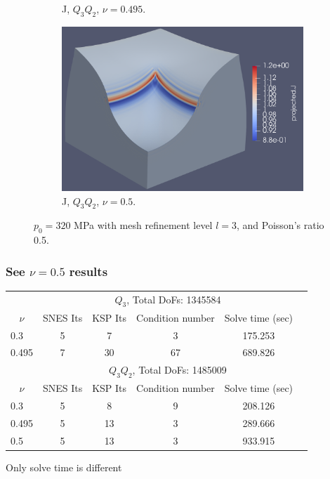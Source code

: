 \documentclass{beamer}
\begin{document}
\begin{frame}
\begin{figure}[H]
\begin{subfigure}{.5\textwidth}
			\caption{J, $Q_3Q_2$, $\nu=0.495$.}
		\end{subfigure}%
		\begin{subfigure}{.5\textwidth}
			\centering
			\includegraphics[width=.68\textwidth]{../figs/J-Q3Q2-320MPa-0.5.png}
			\caption{J, $Q_3Q_2$, $\nu=0.5$.}
		\end{subfigure}
		\caption*{$p_0=320$ MPa with mesh refinement level $l=3$, and Poisson's ratio 0.5.}
	\end{figure}
	
\end{frame}

\begin{frame}
		\frametitle{See $\nu = 0.5$ results}
		\begin{table}[H]
		\centering
		\begin{tabular}{l*{5}{c}}
			\toprule
			\multicolumn{1}{c}{}  & \multicolumn{4}{c}{$Q_3$, Total DoFs: 1345584} \\
			\cmidrule(r){2-5}
			\multicolumn{1}{c}{$\nu$} & \multicolumn{1}{c}{SNES Its} & \multicolumn{1}{c}{KSP Its} & \multicolumn{1}{c}{Condition number} & \multicolumn{1}{c}{Solve time (sec)} \\
			\midrule
			0.3   & 5 & 7  & 3  & 175.253 \\
			0.495 & 7 & 30 & 67 & \alert{689.826} \\
			\midrule
			\multicolumn{1}{c}{}  & \multicolumn{4}{c}{$Q_3Q_2$, Total DoFs: 1485009} \\
			\cmidrule(r){2-5}
			\multicolumn{1}{c}{$\nu$} & \multicolumn{1}{c}{SNES Its} & \multicolumn{1}{c}{KSP Its} & \multicolumn{1}{c}{Condition number} & \multicolumn{1}{c}{Solve time (sec)} \\
			\midrule
			0.3   & 5  & 8  & 9 &  208.126 \\
			0.495 & 5  & 13 & 3 &  \alert{289.666} \\
			0.5   & 5  & 13 & 3 &  933.915  \\
			\bottomrule
		\end{tabular}
	\end{table}

Only solve time is different
\end{frame}
\end{document}
